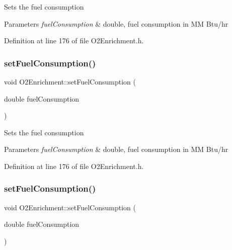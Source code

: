 Sets the fuel consumption 
\begin{DoxyParams}{Parameters}
{\em fuel\+Consumption} & double, fuel consumption in MM Btu/hr \\
\hline
\end{DoxyParams}


Definition at line 176 of file O2\+Enrichment.\+h.

\mbox{\label{class_o2_enrichment_ae2b7ed0ecf7b71b2a68f488c7760efaf}} 
\subsubsection{\texorpdfstring{set\+Fuel\+Consumption()}{setFuelConsumption()}\hspace{0.1cm}{\footnotesize\ttfamily [2/3]}}
{\footnotesize\ttfamily void O2\+Enrichment\+::set\+Fuel\+Consumption (\begin{DoxyParamCaption}\item[{double}]{fuel\+Consumption }\end{DoxyParamCaption})\hspace{0.3cm}{\ttfamily [inline]}}

Sets the fuel consumption 
\begin{DoxyParams}{Parameters}
{\em fuel\+Consumption} & double, fuel consumption in MM Btu/hr \\
\hline
\end{DoxyParams}


Definition at line 176 of file O2\+Enrichment.\+h.

\mbox{\label{class_o2_enrichment_ae2b7ed0ecf7b71b2a68f488c7760efaf}} 
\subsubsection{\texorpdfstring{set\+Fuel\+Consumption()}{setFuelConsumption()}\hspace{0.1cm}{\footnotesize\ttfamily [3/3]}}
{\footnotesize\ttfamily void O2\+Enrichment\+::set\+Fuel\+Consumption (\begin{DoxyParamCaption}\item[{double}]{fuel\+Consumption }\end{DoxyParamCaption})\hspace{0.3cm}{\ttfamily [inline]}}

